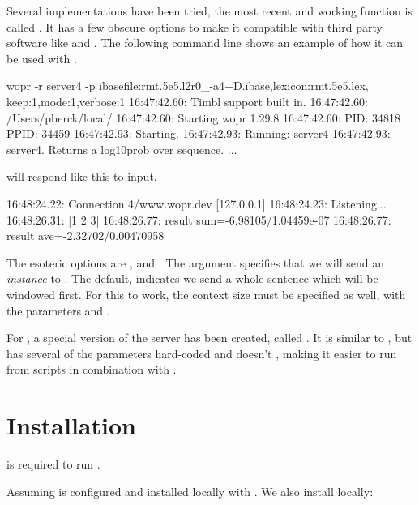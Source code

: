 \documentclass[a4paper,10pt,twoside]{report}
\begin{document}
Several implementations have been tried, the most recent and working
function is called . It has a few obscure options to make
it compatible with third party software like  and
\pbmbmt{}. The following command line shows an example of how it
can be used with \pbmbmt{}.

\begin{bash}{}

wopr -r server4 -p ibasefile:rmt.5e5.l2r0_-a4+D.ibase,lexicon:rmt.5e5.lex,
                   keep:1,mode:1,verbose:1
16:47:42.60: Timbl support built in.
16:47:42.60: /Users/pberck/local/
16:47:42.60: Starting wopr 1.29.8
16:47:42.60: PID:  34818 PPID:  34459
16:47:42.93: Starting.
16:47:42.93: Running: server4
16:47:42.93: server4. Returns a log10prob over sequence.
...
\end{bash}

\Wopr{} will respond like this to input.

\begin{wout}{}
16:48:24.22: Connection 4/www.wopr.dev [127.0.0.1]
16:48:24.23: Listening...
16:48:26.31: |1 2 3|
16:48:26.77: result sum=-6.98105/1.04459e-07
16:48:26.77: result ave=-2.32702/0.00470958
\end{wout}

The esoteric options are , and . The 
argument specifies that we will send an \emph{instance} to
\wopr{}. The default,  indicates we send a whole sentence
which will be windowed first. For this to work, the context size must
be specified as well, with the parameters  and .

For \pbmbmt{}, a special version of the server has been created,
called . It is similar to , but has several of
the parameters hard-coded and doesn't , making it easier to
run from scripts in combination with \pbmbmt{}.

\chapter{Installation}

\Timbl{} is required to run \wopr{}.

Assuming \Timbl{} is configured and installed locally with
. We also install \wopr{} locally:
\end{document}

